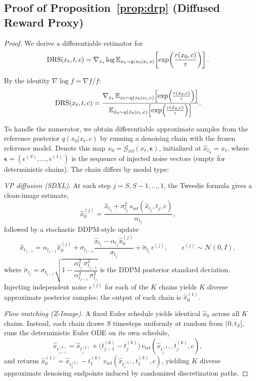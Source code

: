 \subsection{Proof of Proposition~\ref{prop:drp} (Diffused Reward Proxy)}
\label{app:proof_lem4}
\begin{proof}
We derive a differentiable estimator for
\begin{equation}
\mathrm{DRS}(x_t,t,c)
= \nabla_{x_t}\log\mathbb{E}_{x_0\sim q(x_0|x_t,c)}\!\left[\exp\!\left(\frac{r(x_0,c)}{\tau}\right)\right].
\end{equation}

By the identity $\nabla\log f = \nabla f/f$:
\begin{equation}
\mathrm{DRS}(x_t,t,c)
= \frac{\nabla_{x_t}\,\mathbb{E}_{x_0\sim q(x_0|x_t,c)}\!\left[\exp\!\left(\tfrac{r(x_0,c)}{\tau}\right)\right]}
{\mathbb{E}_{\tilde x_0\sim q(\tilde x_0|x_t,c)}\!\left[\exp\!\left(\tfrac{r(\tilde x_0,c)}{\tau}\right)\right]}.
\end{equation}

To handle the numerator, we obtain differentiable approximate samples from the reference posterior $q(x_0|x_t,c)$ by running a denoising chain with the frozen reference model. Denote this map $x_0 = \mathcal{G}_{\mathrm{ref}}(x_t,\boldsymbol{\epsilon})$, initialized at $\hat{x}_{t_S}=x_t$, where $\boldsymbol{\epsilon}=(\epsilon^{(S)},\ldots,\epsilon^{(1)})$ is the sequence of injected noise vectors (empty for deterministic chains). The chain differs by model type:

\emph{VP diffusion (SDXL).} At each step $j=S,S{-}1,\ldots,1$, the Tweedie formula gives a clean-image estimate,
\[
\hat{x}_0^{(j)} = \frac{\hat{x}_{t_j}+\sigma_{t_j}^2\,s_{\mathrm{ref}}(\hat{x}_{t_j},t_j,c)}{\alpha_{t_j}},
\]
followed by a stochastic DDPM-style update
\[
\hat{x}_{t_{j-1}} = \alpha_{t_{j-1}}\hat{x}_0^{(j)} + \sigma_{t_{j-1}}\frac{\hat{x}_{t_j}-\alpha_{t_j}\hat{x}_0^{(j)}}{\sigma_{t_j}} + \tilde\sigma_{t_j}\,\epsilon^{(j)},
\qquad \epsilon^{(j)}\sim\mathcal{N}(0,I),
\]
where $\tilde\sigma_{t_j}=\sigma_{t_{j-1}}\sqrt{1-\dfrac{\alpha_{t_j}^2\,\sigma_{t_{j-1}}^2}{\alpha_{t_{j-1}}^2\,\sigma_{t_j}^2}}$ is the DDPM posterior standard deviation. Injecting independent noise $\epsilon^{(j)}$ for each of the $K$ chains yields $K$ diverse approximate posterior samples; the output of each chain is $\hat{x}_0^{(1)}$.

\emph{Flow matching (Z-Image).} A fixed Euler schedule yields identical $\hat{x}_0$ across all $K$ chains. Instead, each chain draws $S$ timesteps uniformly at random from $(0,t_S]$, runs the deterministic Euler ODE on its own schedule,
\[
\hat{x}_{t_{j-1}^{(k)}} = \hat{x}_{t_j^{(k)}} + \bigl(t_{j-1}^{(k)}-t_j^{(k)}\bigr)\,v_{\mathrm{ref}}\!\left(\hat{x}_{t_j^{(k)}},t_j^{(k)},c\right),
\]
and returns $\hat{x}_0^{(1)}=\hat{x}_{t_1^{(k)}}-t_1^{(k)}\,v_{\mathrm{ref}}(\hat{x}_{t_1^{(k)}},t_1^{(k)},c)$, yielding $K$ diverse approximate denoising endpoints induced by randomized discretization paths.


\end{proof}
